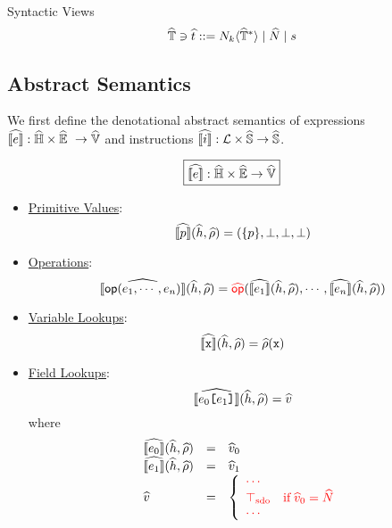 Syntactic Views
\[
  \widehat{\mathbb{T}} \ni \widehat{t} ::= N_k \langle \widehat{\mathbb{T}}^* \rangle \mid \widehat{N} \mid s
\]


\subsection{Abstract Semantics}
We first define the denotational abstract semantics of expressions
$\widehat{\llbracket{e}\rrbracket}: \widehat{\mathbb{H}} \times \widehat{\mathbb{E}} \ \rightarrow \widehat{\mathbb{V}}$
and instructions
$\widehat{\llbracket{i}\rrbracket}: \mathcal{L} \times \widehat{\mathbb{S}} \rightarrow \widehat{\mathbb{S}}$.

\[
  \framebox{$\asem{\expr}: \aheapset \times \aenvset \rightarrow \avalset$}
\]
\begin{itemize}
  \item \underline{Primitive Values}:
    \[
      \widehat{\llbracket{p}\rrbracket}(\widehat{h}, \widehat{\rho}) = (\{p\}, \bot, \bot, \bot)
    \]
  \item \underline{Operations}:
    \[
      \widehat{\llbracket{\textsf{op}( e_1, \cdots, e_n )}\rrbracket}(\widehat{h}, \widehat{\rho}) =
        {\color{red}{\widehat{\textsf{op}}}} ( \widehat{\llbracket{e_1}\rrbracket}(\widehat{h}, \widehat{\rho}), \cdots, \widehat{\llbracket{e_n}\rrbracket}(\widehat{h}, \widehat{\rho}) )
    \]
  \item \underline{Variable Lookups}:
    \[
      \asem{\varx}(\aheap, \aenv) = \aenv(\varx)
    \]
  \item \underline{Field Lookups}:
    \[
      \asem{\expr_0 \kwsl \expr_1 \kwsr}(\aheap, \aenv) = \aval
    \]
    where
    \[
      \begin{array}{lcl}
        \asem{\expr_0}(\aheap, \aenv) &=& \aval_0\\
        \asem{\expr_1}(\aheap, \aenv) &=& \aval_1\\
        \aval &=& \left\{
          \inred{
          \begin{array}{ll}
%
%
            \cdots\\
            \sdotop & \text{if} \;
            \aval_0 = \abs{\nt} \\
            \cdots\\
          \end{array}
          }
        \right.\\
      \end{array}
    \]
\end{itemize}

